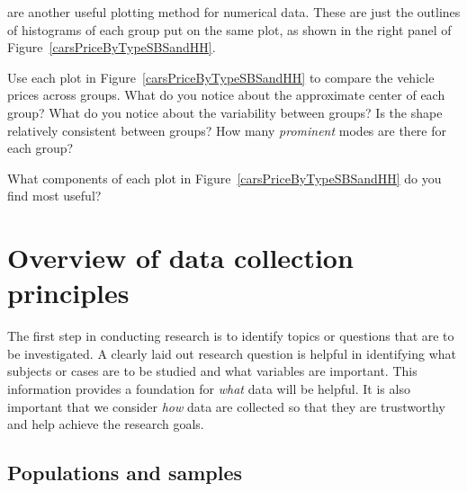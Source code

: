  are another useful plotting method for numerical data. These are just the outlines of histograms of each group put on the same plot, as shown in the right panel of Figure~\ref{carsPriceByTypeSBSandHH}.

\begin{exercise} \label{comparingPriceByTypeExercise}
Use each plot in Figure~\ref{carsPriceByTypeSBSandHH} to compare the vehicle prices across groups. What do you notice about the approximate center of each group? What do you notice about the variability between groups? Is the shape relatively consistent between groups? How many \emph{prominent} modes are there for each group?
\end{exercise}

\begin{exercise}
What components of each plot in Figure~\ref{carsPriceByTypeSBSandHH} do you find most useful?
\end{exercise}


\section{Overview of data collection principles}
\label{overviewOfDataCollectionPrinciples}

The first step in conducting research is to identify topics or questions that are to be investigated. A clearly laid out research question is helpful in identifying what subjects or cases are to be studied and what variables are important. This information provides a foundation for \emph{what} data will be helpful. It is also important that we consider \emph{how} data are collected so that they are trustworthy and help achieve the research goals. %

\subsection{Populations and samples}
\label{populationsAndSamples}

